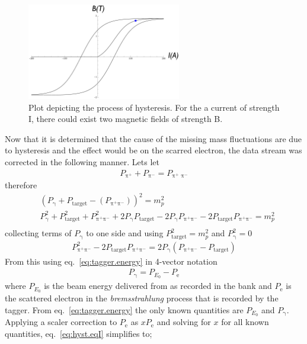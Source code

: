 \begin{figure}\begin{center}
\includegraphics[width=0.6\textwidth]{figures/calib/tag/ecor/hysteresis_keynote.eps}
\caption[Plot Depicting the Process of Hysteresis]{\label{fig:hyst}Plot depicting the process of hysteresis. For the a current of strength I, there could exist two magnetic fields of strength B.}
\end{center}\end{figure}
\FloatBarrier
Now that it is determined that the cause of the  missing mass fluctuations are due to hysteresis and the effect would be on the scarred electron, the  data stream was corrected in the following manner. Lets let 
\begin{align}
P_\text{π$^+$} + P_\text{π$^-$} = P_\text{π$^+$ π$^-$} \nonumber
\end{align}
therefore
\begin{align}
&(P_\text{γ} + P_\mathrm{target} - (P_\text{π$^+$π$^-$}))^2 = m_p^2 \\
& P_\text{γ}^2 + P_\mathrm{target}^2 + P_\text{π$^+$π$^-$}^2 + 2P_\text{γ}P_\mathrm{target} - 2P_\text{γ}P_\text{π$^+$π$^-$} - 2P_\mathrm{target}P_\text{π$^+$π$^-$}= m_p^2\\
\end{align}
collecting terms of $P_\text{γ}$ to one side and using $P_\mathrm{target}^2 = m_p^2 $ and $P_\text{γ}^2 = 0$
\begin{align}\label{eq:hyst.eqI}
 P_\text{π$^+$π$^-$}^2 - 2P_\mathrm{target}P_\text{π$^+$π$^-$}= 2P_\text{γ}(P_\text{π$^+$π$^-$} - P_\mathrm{target})
\end{align}
From this using eq.~\ref{eq:tagger.energy} in 4-vector notation
\begin{align}\label{eq:tagger.energyII}
P_\text{γ} = P_{E_0} - P_\text{e}\nonumber
\end{align}
where $P_{E_0}$ is the beam energy delivered from  as recorded in the  bank and $P_\text{e}$ is the scattered electron in the \emph{bremsstrahlung} process that is recorded by the tagger. From eq.~\ref{eq:tagger.energy} the only known quantities are $P_{E_0}$ and $P_\text{γ}$. Applying a scaler correction to $P_\text{e}$ as $xP_\text{e}$ and solving for $x$ for all known quantities, eq.~\ref{eq:hyst.eqI} simplifies to;
